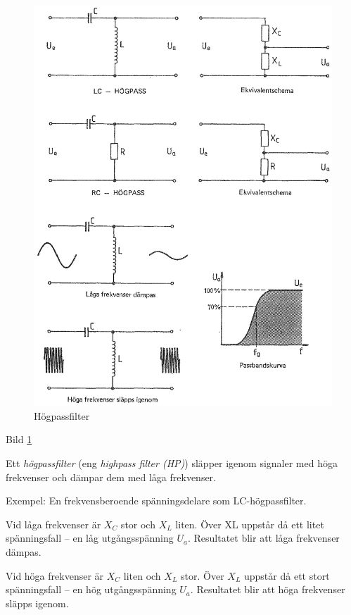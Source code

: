 \begin{figure}
\includegraphics[width=\textwidth]{images/cropped_pdfs/bild_2_3-22.pdf}
\caption{Högpassfilter}
\label{fig:BildII3-22}
\end{figure}

Bild \ref{fig:BildII3-22}

Ett \emph{högpassfilter} (eng \emph{highpass filter (HP)}) släpper igenom
signaler med höga frekvenser och dämpar dem med låga frekvenser.

Exempel: En frekvensberoende spänningsdelare som LC-högpassfilter.

Vid låga frekvenser är \(X_C\) stor och \(X_L\) liten. Över XL uppstår då ett
litet spänningsfall -- en låg utgångsspänning \(U_a\). Resultatet blir att
låga frekvenser dämpas.

Vid höga frekvenser är \(X_C\) liten och \(X_L\) stor. Över \(X_L\) uppstår då
ett stort spänningsfall -- en hög utgångsspänning \(U_a\). Resultatet blir att
höga frekvenser släpps igenom.

